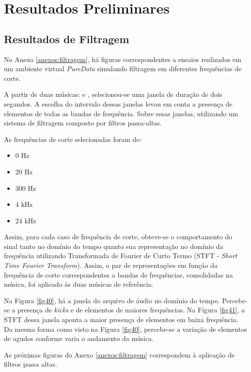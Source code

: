 \chapter[Resultados Preliminares]{Resultados Preliminares}
\label{sec:Resultados}

\section{Resultados de Filtragem}

No Anexo \ref{anexos:filtragem}, há figuras correspondentes a ensaios realizados em um ambiente virtual \textit{PureData} simulando filtragem em diferentes frequências de corte.


A partir de duas músicas: \cite{track01} e \cite{track02}, selecionou-se uma janela de duração de dois segundos. A escolha do intervalo dessas janelas levou em conta a presença de elementos de todas as bandas de frequência. Sobre essas janelas, utilizando um sistema de filtragem composto por filtros passa-altas. 

As frequências de corte selecionadas foram de:

\begin{itemize}
    \item 0 Hz
    \item 20 Hz
    \item 300 Hz
    \item 4 kHz
    \item 24 kHz
\end{itemize}

Assim, para cada caso de frequência de corte, obteve-se o comportamento do sinal tanto no domínio do tempo quanto sua representação no domínio da frequência utilizando Transformada de Fourier de Curto Termo (STFT - \textit{Short Time Fourier Transform}). Assim, o par de representações em função da frequência de corte correspondentes a bandas de frequências, consolidadas na música, foi aplicado às duas músicas de referência. 

Na Figura \ref{fig40}, há a janela do arquivo de áudio no domínio do tempo. Percebe-se a presença de \textit{kicks} e de elementos de maiores frequências. Na Figura \ref{fig41}, a STFT dessa janela aponta a maior presença de elementos em baixa frequência. Da mesma forma como visto na Figura \ref{fig40}, percebe-se a variação de elementos de agudos conforme varia o andamento da música. 

As próximas figuras do Anexo \ref{anexos:filtragem} correspondem à aplicação de filtros passa altas.


